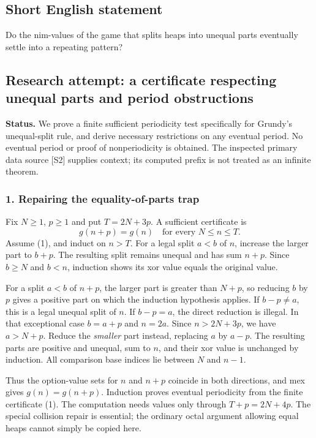 \documentclass[11pt,a4paper]{article}
\begin{document}
\subsection{Short English statement}

Do the nim-values of the game that splits heaps into unequal parts eventually settle into a repeating pattern?

\subsection{Research attempt: a certificate respecting unequal parts and period obstructions}
\textbf{Status.} We prove a finite sufficient periodicity test specifically for Grundy's unequal-split rule, and derive necessary restrictions on any eventual period. No eventual period or proof of nonperiodicity is obtained. The inspected primary data source [S2] supplies context; its computed prefix is not treated as an infinite theorem.

\subsubsection{1. Repairing the equality-of-parts trap}
Fix $N\geq1$, $p\geq1$ and put $T=2N+3p$. A sufficient certificate is
\[g(n+p)=g(n)\quad\text{for every }N\leq n\leq T.\tag{1}\]
Assume (1), and induct on $n>T$. For a legal split $a<b$ of $n$, increase the larger part to $b+p$. The resulting split remains unequal and has sum $n+p$. Since $b\geq N$ and $b<n$, induction shows its xor value equals the original value.

For a split $a<b$ of $n+p$, the larger part is greater than $N+p$, so reducing $b$ by $p$ gives a positive part on which the induction hypothesis applies. If $b-p\ne a$, this is a legal unequal split of $n$. If $b-p=a$, the direct reduction is illegal. In that exceptional case $b=a+p$ and $n=2a$. Since $n>2N+3p$, we have $a>N+p$. Reduce the \emph{smaller} part instead, replacing $a$ by $a-p$. The resulting parts are positive and unequal, sum to $n$, and their xor value is unchanged by induction. All comparison base indices lie between $N$ and $n-1$.

Thus the option-value sets for $n$ and $n+p$ coincide in both directions, and mex gives $g(n)=g(n+p)$. Induction proves eventual periodicity from the finite certificate (1). The computation needs values only through $T+p=2N+4p$. The special collision repair is essential; the ordinary octal argument allowing equal heaps cannot simply be copied here.
\end{document}
